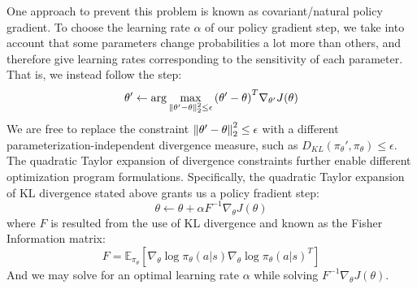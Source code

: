 One approach to prevent this problem is known as covariant/natural policy gradient.
To choose the learning rate $\alpha$ of our policy gradient step, we take into account that some parameters change probabilities a lot more than others, and therefore give learning rates corresponding to the sensitivity of each parameter.
That is, we instead follow the step:
\[
    \theta' \leftarrow \arg \max_{\pnorm[2]{\theta' - \theta}{2} \leq \epsilon} {(\theta' - \theta)}^T \nabla_{\theta'} J(\theta)
\]
We are free to replace the constraint $\pnorm[2]{\theta' - \theta}{2} \leq \epsilon$ with a different parameterization-independent divergence measure, such as $D_{KL} (\pi_\theta', \pi_\theta) \leq \epsilon$.
The quadratic Taylor expansion of divergence constraints further enable different optimization program formulations.
Specifically, the quadratic Taylor expansion of KL divergence stated above grants us a policy fradient step:
\[
    \theta \leftarrow \theta + \alpha F^{-1} \nabla_\theta J(\theta)
\]
where $F$ is resulted from the use of KL divergence and known as the Fisher Information matrix:
\[
    F = \mathbb{E}_{\pi_\theta} \left[ \nabla_\theta \log \pi_\theta (a|s) \nabla_\theta \log {\pi_\theta (a|s)}^T \right]
\]
And we may solve for an optimal learning rate $\alpha$ while solving $F^{-1} \nabla_\theta J(\theta)$.
